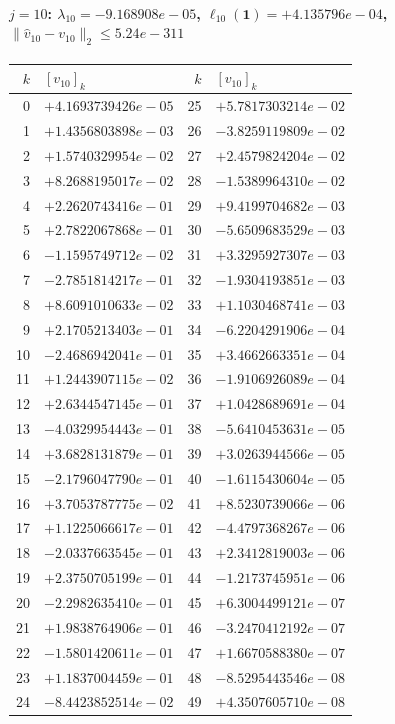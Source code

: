 \paragraph{$j = 10$: $\lambda_{10} = -9.168908e-05$, \quad $\ell_{10}(\mathbf{1}) = +4.135796e-04$, \quad $\|\hat{v}_{10} - v_{10}\|_2 \leq 5.24e-311$}
\begin{center}
{\footnotesize
\begin{tabular}{r@{\;\;}l@{\quad}r@{\;\;}l}
\toprule
$k$ & $[v_{10}]_k$ & $k$ & $[v_{10}]_k$ \\
\midrule
0 & $+4.1693739426e-05$ & 25 & $+5.7817303214e-02$ \\
1 & $+1.4356803898e-03$ & 26 & $-3.8259119809e-02$ \\
2 & $+1.5740329954e-02$ & 27 & $+2.4579824204e-02$ \\
3 & $+8.2688195017e-02$ & 28 & $-1.5389964310e-02$ \\
4 & $+2.2620743416e-01$ & 29 & $+9.4199704682e-03$ \\
5 & $+2.7822067868e-01$ & 30 & $-5.6509683529e-03$ \\
6 & $-1.1595749712e-02$ & 31 & $+3.3295927307e-03$ \\
7 & $-2.7851814217e-01$ & 32 & $-1.9304193851e-03$ \\
8 & $+8.6091010633e-02$ & 33 & $+1.1030468741e-03$ \\
9 & $+2.1705213403e-01$ & 34 & $-6.2204291906e-04$ \\
10 & $-2.4686942041e-01$ & 35 & $+3.4662663351e-04$ \\
11 & $+1.2443907115e-02$ & 36 & $-1.9106926089e-04$ \\
12 & $+2.6344547145e-01$ & 37 & $+1.0428689691e-04$ \\
13 & $-4.0329954443e-01$ & 38 & $-5.6410453631e-05$ \\
14 & $+3.6828131879e-01$ & 39 & $+3.0263944566e-05$ \\
15 & $-2.1796047790e-01$ & 40 & $-1.6115430604e-05$ \\
16 & $+3.7053787775e-02$ & 41 & $+8.5230739066e-06$ \\
17 & $+1.1225066617e-01$ & 42 & $-4.4797368267e-06$ \\
18 & $-2.0337663545e-01$ & 43 & $+2.3412819003e-06$ \\
19 & $+2.3750705199e-01$ & 44 & $-1.2173745951e-06$ \\
20 & $-2.2982635410e-01$ & 45 & $+6.3004499121e-07$ \\
21 & $+1.9838764906e-01$ & 46 & $-3.2470412192e-07$ \\
22 & $-1.5801420611e-01$ & 47 & $+1.6670588380e-07$ \\
23 & $+1.1837004459e-01$ & 48 & $-8.5295443546e-08$ \\
24 & $-8.4423852514e-02$ & 49 & $+4.3507605710e-08$ \\
\bottomrule
\end{tabular}
}
\end{center}

